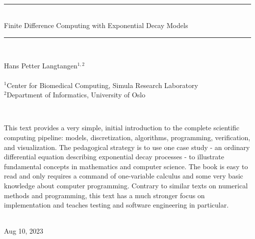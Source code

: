 \documentclass[graybox,sectrefs,envcountresetchap,open=right,final]{svmonodo}
\begin{document}
\thispagestyle{empty}
\hbox{\ \ }
\vfill
\begin{center}
{\huge{\bfseries{
\begin{spacing}{1.25}
{\rule{\linewidth}{0.5mm}} \\[0.4cm]
{Finite Difference Computing with Exponential Decay Models}
\\[0.4cm] {\rule{\linewidth}{0.5mm}} \\[1.5cm]
\end{spacing}
}}}


\vspace{0.5cm}

{\Large\textsf{Hans Petter Langtangen${}^{1, 2}$}}\\ [3mm]

\ \\ [2mm]

{\large\textsf{${}^1$Center for Biomedical Computing, Simula Research Laboratory} \\ [1.5mm]}
{\large\textsf{${}^2$Department of Informatics, University of Oslo} \\ [1.5mm]}

\ \\ [13mm]
\begin{center}
\begin{minipage}{0.9\linewidth}
\small
This text provides a very simple, initial introduction to the complete
scientific computing pipeline: models, discretization, algorithms,
programming, verification, and visualization. The pedagogical strategy
is to use one case study - an ordinary differential equation
describing exponential decay processes - to illustrate fundamental
concepts in mathematics and computer science. The book is easy to read
and only requires a command of one-variable calculus and some very
basic knowledge about computer programming. Contrary to similar texts
on numerical methods and programming, this text has a much stronger
focus on implementation and teaches testing and software engineering
in particular.
\end{minipage}
\end{center}

\ \\ [10mm]
{\large\textsf{Aug 10, 2023}}
\end{center}
\vfill
\clearpage
\end{document}
